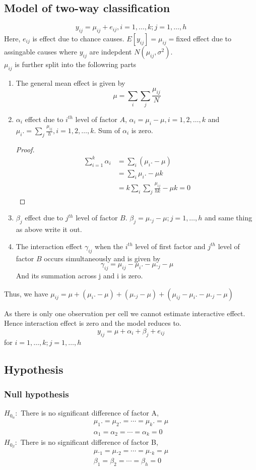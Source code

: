 \documentclass[oneside,11pt,pdftex]{book}%
\numberwithin{equation}{section}
\numberwithin{section}{chapter}
\numberwithin{equation}{chapter}
\begin{document}
\subsection{Model of two-way classification}
\[ y_{ij} = \mu_{ij}+e_{ij}, i=1,\dots,k; j=1,\dots,h\]
Here, $ e_{ij} $ is effect due to chance causes. $ E[y_{ij}] =\mu_{ij}=$fixed effect due to assingable causes where $ y_{ij} $ are indepdent $ N(\mu_{ij},\sigma^2) $. \\
$ \mu_{ij} $ is further split into the followring parts 
\begin{enumerate}
	\item The general mean effect is given by \[ \mu=\sum_i \sum_j \frac{\mu_{ij}}{N} \]
	\item $ \alpha_i  $ effect due to $ i^{th} $ level of factor $ A $, $ \alpha_i=\mu_i-\mu, i=1,2,\dots, k$ and $ \mu_i.=\sum_j \frac{\mu_{ij}}{h}, i=1,2,\dots, k $. Sum of $ \alpha_i  $ is zero.
	\begin{proof}
		\begin{align*}
			\sum_{i=1}^k \alpha_i &= \sum_i (\mu_i.-\mu)\\
			&=\sum_i  \mu_i.-\mu k\\
			&=k\sum_i \sum_j \frac{\mu_{ij}}{hk}-\mu k =0
		\end{align*}
	\end{proof}
	\item $ \beta_j $ effect due to $ j^{th} $ level of factor $ B $. $ \beta_j=\mu._j-\mu; j=1,\dots,h $ and same thing as above write it out.
	\item The interaction effect $ \gamma_{ij} $ when the $ i^{th} $ level of first factor and $ j^{th} $ level of factor $ B $ occurs simultaneously and is given by 
	\[ \gamma_{ij}= \mu_{ij}-\mu_i.-\mu._j-\mu\]
	And its summation across j and i is zero.
\end{enumerate}
Thus, we have $ \mu_{ij} =\mu+(\mu_i.-\mu)+(\mu._j-\mu)+(\mu_{ij}-\mu_i.-\mu._j-\mu)$

As there is only one observation per cell we cannot estimate interactive effect. Hence interaction effect is zero and the model reduces to.
\[ y_{ij}=\mu+\alpha_i+\beta_j+e_{ij} \]
for $ i=1,\dots,k;j=1,\dots,h $

\subsection{Hypothesis}
\subsubsection{Null hypothesis}
$ H_{0_{\alpha}}: $ There is no significant difference of factor A,
\begin{align*}
	\mu_1.=\mu_2.=\cdots=\mu_k.=\mu\\
	\alpha_1=\alpha_2=\cdots=\alpha_k=0
\end{align*}
$ H_{0_{\beta}}: $ There is no significant difference of factor B,
\begin{align*}
	\mu._1=\mu._2=\cdots=\mu._k=\mu\\
	\beta_1=\beta_2=\cdots=\beta_h=0
\end{align*}
\end{document}
